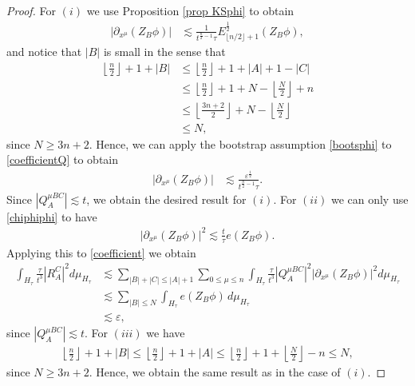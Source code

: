 \documentclass{article}
\begin{document}
\begin{proof}
For $ ( i ) $ we use Proposition \ref{prop KSphi} to obtain
\begin{align}
| \partial_{ x^\mu } ( Z_B \phi ) | & \lesssim \frac{ 1 }{ t^{ \frac{ n }{ 2 } - 1 } \tau } E_{ \lfloor n / 2 \rfloor + 1 }^{ \frac12 } ( Z_B \phi ) , \label{coefficientQ}
\end{align}
and notice that $ | B | $ is small in the sense that
\begin{align*}
\left\lfloor \frac{ n }{ 2 } \right\rfloor +1 + | B | & \leq \left\lfloor \frac{ n }{ 2 } \right\rfloor + 1 + | A | + 1 - | C | \\
& \leq \left\lfloor \frac{ n }{ 2 } \right\rfloor + 1 + N - \left\lfloor \frac{ N }{ 2 } \right\rfloor + n \\
& \leq \left\lfloor \frac{ 3 n + 2 }{ 2 } \right\rfloor + N - \left\lfloor \frac{ N }{ 2 } \right\rfloor \\
& \leq N ,
\end{align*}
since $ N \geq 3 n + 2 $. Hence, we can apply the bootstrap assumption \eqref{bootsphi} to \eqref{coefficientQ} to obtain
\begin{align*}
| \partial_{ x^\mu } ( Z_B \phi ) | & \lesssim \frac{ \varepsilon^\frac{ 1 }{ 2 } }{ t^{ \frac{ n }{ 2 } - 1 } \tau } .
\end{align*}
Since $ | Q^{ \mu B C }_{ A } | \lesssim t $, we obtain the desired result for $ ( i ) $. For $ ( i i ) $ we can only use \eqref{chiphiphi} to have
\begin{align*}
| \partial_{ x^\mu } ( Z_B \phi ) |^2 \lesssim \frac{ t }{ \tau } e ( Z_B \phi ) .
\end{align*}
Applying this to \eqref{coefficient} we obtain
\begin{align*}
\int_{ H_\tau } \frac{ \tau }{ t^3 } | R^C_A |^2 d \mu_{ H_\tau } & \lesssim \sum_{ | B | + | C | \leq | A | + 1 } \sum_{ 0 \leq \mu \leq n } \int_{ H_\tau } \frac{ \tau }{ t^3 } | Q^{ \mu B C }_{ A } |^2 | \partial_{ x^\mu } ( Z_B \phi ) |^2 d \mu_{ H_\tau } \\
& \lesssim \sum_{ | B | \leq N } \int_{ H_\tau } e ( Z_B \phi ) \, d \mu_{ H_\tau } \\
& \lesssim \varepsilon ,
\end{align*}
since $ | Q^{ \mu B C }_{ A } | \lesssim t $. For $ ( iii ) $ we have
\begin{align*}
\left\lfloor \frac{ n }{ 2 } \right\rfloor +1 + | B | \leq \left\lfloor \frac{ n }{ 2 } \right\rfloor +1 + | A | \leq \left\lfloor \frac{ n }{ 2 } \right\rfloor + 1 + \left\lfloor \frac{ N }{ 2 } \right\rfloor - n \leq N ,
\end{align*}
since $ N \geq 3 n + 2 $. Hence, we obtain the same result as in the case of $ ( i ) $.
\end{proof}
\end{document}
